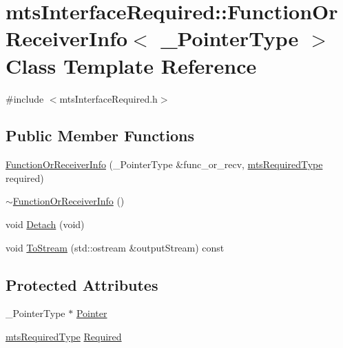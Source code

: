 \hypertarget{classmts_interface_required_1_1_function_or_receiver_info}{\section{mts\-Interface\-Required\-:\-:Function\-Or\-Receiver\-Info$<$ \-\_\-\-Pointer\-Type $>$ Class Template Reference}
\label{classmts_interface_required_1_1_function_or_receiver_info}
}


{\ttfamily \#include $<$mts\-Interface\-Required.\-h$>$}

\subsection*{Public Member Functions}
\begin{DoxyCompactItemize}
\item 
\hyperlink{classmts_interface_required_1_1_function_or_receiver_info_a7c68f26b12ce32d671cf19337b2258cc}{Function\-Or\-Receiver\-Info} (\-\_\-\-Pointer\-Type \&func\-\_\-or\-\_\-recv, \hyperlink{mts_forward_declarations_8h_a9ef1ce54724afde7802db326ff8606f3}{mts\-Required\-Type} required)
\item 
\hyperlink{classmts_interface_required_1_1_function_or_receiver_info_a4d3a617eeadc9352a99cea50c414aa5a}{$\sim$\-Function\-Or\-Receiver\-Info} ()
\item 
void \hyperlink{classmts_interface_required_1_1_function_or_receiver_info_a83943d97434e35c85e547a34eff22f59}{Detach} (void)
\item 
void \hyperlink{classmts_interface_required_1_1_function_or_receiver_info_a87ede0d4d1fa02c6d19f40ec2bef7c45}{To\-Stream} (std\-::ostream \&output\-Stream) const 
\end{DoxyCompactItemize}
\subsection*{Protected Attributes}
\begin{DoxyCompactItemize}
\item 
\-\_\-\-Pointer\-Type $\ast$ \hyperlink{classmts_interface_required_1_1_function_or_receiver_info_ab4394777d1e10c3d4ea888e0d5d90d85}{Pointer}
\item 
\hyperlink{mts_forward_declarations_8h_a9ef1ce54724afde7802db326ff8606f3}{mts\-Required\-Type} \hyperlink{classmts_interface_required_1_1_function_or_receiver_info_a6459b7ea33ff75f81cc0c48e1c12cc3a}{Required}
\end{DoxyCompactItemize}
